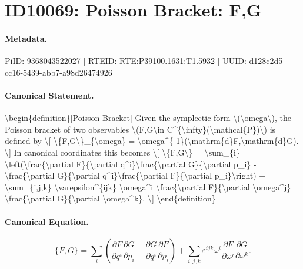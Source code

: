 \section*{ID10069: Poisson Bracket: F,G}
\paragraph{Metadata.}
PiID: 9368043522027 | RTEID: RTE:P39100.1631:T1.5932 | UUID: d128c2d5-cc16-5439-abb7-a98d26474926

\paragraph{Canonical Statement.}
\textbackslash{}begin\{definition\}[Poisson Bracket] Given the symplectic form \textbackslash{}(\textbackslash{}omega\textbackslash{}), the Poisson bracket of two observables \textbackslash{}(F,G\textbackslash{}in C\textasciicircum{}\{\textbackslash{}infty\}(\textbackslash{}mathcal\{P\})\textbackslash{}) is defined by \textbackslash{}[ \textbackslash{}\{F,G\textbackslash{}\}\_\{\textbackslash{}omega\} = \textbackslash{}omega\textasciicircum{}\{-1\}(\textbackslash{}mathrm\{d\}F,\textbackslash{}mathrm\{d\}G). \textbackslash{}] In canonical coordinates this becomes \textbackslash{}[ \textbackslash{}\{F,G\textbackslash{}\} = \textbackslash{}sum\_\{i\} \textbackslash{}left(\textbackslash{}frac\{\textbackslash{}partial F\}\{\textbackslash{}partial q\textasciicircum{}i\}\textbackslash{}frac\{\textbackslash{}partial G\}\{\textbackslash{}partial p\_i\} - \textbackslash{}frac\{\textbackslash{}partial G\}\{\textbackslash{}partial q\textasciicircum{}i\}\textbackslash{}frac\{\textbackslash{}partial F\}\{\textbackslash{}partial p\_i\}\textbackslash{}right) + \textbackslash{}sum\_\{i,j,k\} \textbackslash{}varepsilon\textasciicircum{}\{ijk\} \textbackslash{}omega\textasciicircum{}i \textbackslash{}frac\{\textbackslash{}partial F\}\{\textbackslash{}partial \textbackslash{}omega\textasciicircum{}j\} \textbackslash{}frac\{\textbackslash{}partial G\}\{\textbackslash{}partial \textbackslash{}omega\textasciicircum{}k\}. \textbackslash{}] \textbackslash{}end\{definition\}

\paragraph{Canonical Equation.}
\[
\{F,G\} = \sum_{i} \left(\frac{\partial F}{\partial q^i}\frac{\partial G}{\partial p_i} - \frac{\partial G}{\partial q^i}\frac{\partial F}{\partial p_i}\right) + \sum_{i,j,k} \varepsilon^{ijk} \omega^i \frac{\partial F}{\partial \omega^j} \frac{\partial G}{\partial \omega^k}.
\]

